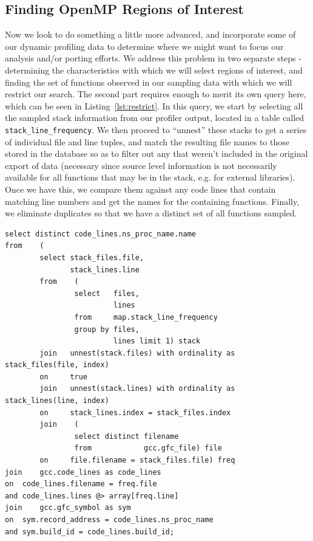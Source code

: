 \subsection{Finding OpenMP Regions of Interest}
Now we look to do something a little more advanced, and incorporate some of our dynamic profiling data to determine where we might want to focus our analysis and/or porting efforts.
We address this problem in two separate steps - determining the characteristics with which we will select regions of interest, and finding the set of functions observed in our sampling data with which we will restrict our search.
The second part requires enough to merit its own query here, which can be seen in Listing~\ref{lst:restrict}.
In this query, we start by selecting all the sampled stack information from our profiler output, located in a table called \texttt{stack\_line\_frequency}.
We then proceed to ``unnest'' these stacks to get a series of individual file and line tuples, and match the resulting file names to those stored in the database so as to filter out any that weren't included in the original export of data (necessary since source level information is not necessarily available for all functions that may be in the stack, e.g. for external libraries).
Once we have this, we compare them against any code lines that contain matching line numbers and get the names for the containing functions.
Finally, we eliminate duplicates so that we have a distinct set of all functions sampled.

\begin{lstlisting}[caption=Determing Functions Sampled, label=lst:restrict]
select distinct code_lines.ns_proc_name.name
from	(
		select stack_files.file,
		       stack_lines.line
		from	(
				select   files,
				         lines
				from     map.stack_line_frequency
				group by files,
				         lines limit 1) stack
		join   unnest(stack.files) with ordinality as stack_files(file, index)
		on     true
		join   unnest(stack.lines) with ordinality as stack_lines(line, index)
		on     stack_lines.index = stack_files.index
		join	(
				select distinct filename
				from            gcc.gfc_file) file
		on     file.filename = stack_files.file) freq
join	gcc.code_lines as code_lines
on	code_lines.filename = freq.file
and	code_lines.lines @> array[freq.line]
join	gcc.gfc_symbol as sym
on	sym.record_address = code_lines.ns_proc_name
and	sym.build_id = code_lines.build_id;
\end{lstlisting}

